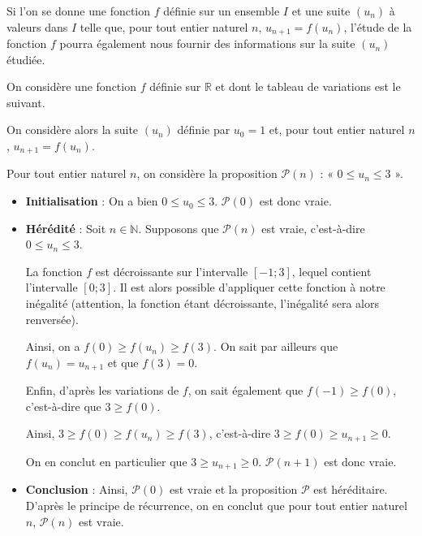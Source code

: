 \documentclass[11pt,fleqn]{book} %
\begin{document}
\newpage

Si l'on se donne une fonction $f$ définie sur un ensemble $I$ et une suite $(u_n)$ à valeurs dans $I$ telle que, pour tout entier naturel $n$, $u_{n+1}=f(u_n)$, l'étude de la fonction $f$ pourra également nous fournir des informations sur la suite $(u_n)$ étudiée.

\begin{example}On considère une fonction $f$ définie sur $\mathbb{R}$ et dont le tableau de variations est le suivant.

\begin{center}
\end{center}

On considère alors la suite $(u_n)$ définie par $u_0=1$ et, pour tout entier naturel $n$, $u_{n+1}=f(u_n)$. 

Pour tout entier naturel $n$, on considère la proposition $\mathcal{P}(n)$ : « $0 \leqslant u_n \leqslant 3$ ».
\begin{itemize}
\item \textbf{Initialisation} : On a bien $0 \leqslant u_0 \leqslant 3$. $\mathcal{P}(0)$ est donc vraie.
\vskip5pt
\item \textbf{Hérédité} : Soit $n\in\mathbb{N}$. Supposons que $\mathcal{P}(n)$ est vraie, c'est-à-dire $0 \leqslant u_n \leqslant 3$. 

La fonction $f$ est décroissante sur l'intervalle $[-1;3]$, lequel contient l'intervalle $[0;3]$. Il est alors possible d'appliquer cette fonction à notre inégalité (attention, la fonction étant décroissante, l'inégalité sera alors renversée).

Ainsi, on a $f(0) \geqslant f(u_n) \geqslant f(3)$. On sait par ailleurs que $f(u_n)=u_{n+1}$ et que $f(3)=0$.

Enfin, d'après les variations de $f$, on sait également que $f(-1) \geqslant f(0)$, c'est-à-dire que $3 \geqslant f(0)$.

Ainsi, $3 \geqslant f(0) \geqslant f(u_n) \geqslant f(3)$, c'est-à-dire $3\geqslant f(0) \geqslant u_{n+1} \geqslant 0$.

On en conclut en particulier que $3 \geqslant u_{n+1} \geqslant 0$. $\mathcal{P}(n+1)$ est donc vraie.
\vskip5pt
\item \textbf{Conclusion} : Ainsi, $\mathcal{P}(0)$ est vraie et la proposition $\mathcal{P}$ est héréditaire. D'après le principe de récurrence, on en conclut que pour tout entier naturel $n$, $\mathcal{P}(n)$ est vraie.
\end{itemize}\end{example}
\end{document}
